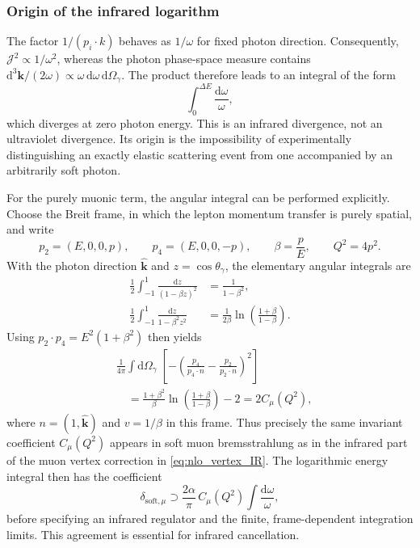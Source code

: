 \subsubsection{Origin of the infrared logarithm}

The factor $1/(p_i\cdot k)$ behaves as $1/\omega$ for fixed photon direction.
Consequently, $\mathcal J^2\propto1/\omega^2$, whereas the photon phase-space
measure contains $\mathrm d^3\boldsymbol k/(2\omega)
\propto\omega\,\mathrm d\omega\,\mathrm d\Omega_\gamma$.
The product therefore leads to an integral of the form
\begin{equation}
 \int_0^{\Delta E}\frac{\mathrm d\omega}{\omega},
 \label{eq:nlo_soft_log}
\end{equation}
which diverges at zero photon energy. This is an infrared divergence, not an
ultraviolet divergence. Its origin is the impossibility of experimentally
distinguishing an exactly elastic scattering event from one accompanied by an
arbitrarily soft photon.

For the purely muonic term, the angular integral can be performed explicitly.
Choose the Breit frame, in which the lepton momentum transfer is purely
spatial, and write
\begin{equation}
 p_2=(E,0,0,p),\qquad p_4=(E,0,0,-p),
 \qquad \beta=\frac{p}{E},\qquad Q^2=4p^2.
\end{equation}
With the photon direction $\hat{\boldsymbol k}$ and
$z=\cos\theta_\gamma$, the elementary angular integrals are
\begin{align}
 \frac12\int_{-1}^{1}\frac{\mathrm dz}{(1-\beta z)^2}
   &=\frac{1}{1-\beta^2},\\
 \frac12\int_{-1}^{1}\frac{\mathrm dz}{1-\beta^2 z^2}
   &=\frac{1}{2\beta}\ln\!\left(\frac{1+\beta}{1-\beta}\right).
\end{align}
Using $p_2\cdot p_4=E^2(1+\beta^2)$ then yields
\begin{align}
 &\frac{1}{4\pi}\int\!\mathrm d\Omega_\gamma\;
 \left[-\left(
 \frac{p_4}{p_4\cdot n}-\frac{p_2}{p_2\cdot n}
 \right)^2\right]\\
 &\quad=\frac{1+\beta^2}{\beta}
       \ln\!\left(\frac{1+\beta}{1-\beta}\right)-2
   =2C_\mu(Q^2),
 \label{eq:nlo_angular_coefficient}
\end{align}
where $n=(1,\hat{\boldsymbol k})$ and $v=1/\beta$ in this frame.
Thus precisely the same invariant coefficient $C_\mu(Q^2)$ appears in
soft muon bremsstrahlung as in the infrared part of the muon vertex
correction in \autoref{eq:nlo_vertex_IR}. The logarithmic energy integral
then has the coefficient
\begin{equation}
 \delta_{\mathrm{soft},\mu}\supset
    \frac{2\alpha}{\pi}\,C_\mu(Q^2)
        \int\frac{\mathrm d\omega}{\omega},
 \label{eq:nlo_soft_coefficient}
\end{equation}
before specifying an infrared regulator and the finite, frame-dependent
integration limits. This agreement is essential for infrared cancellation.

